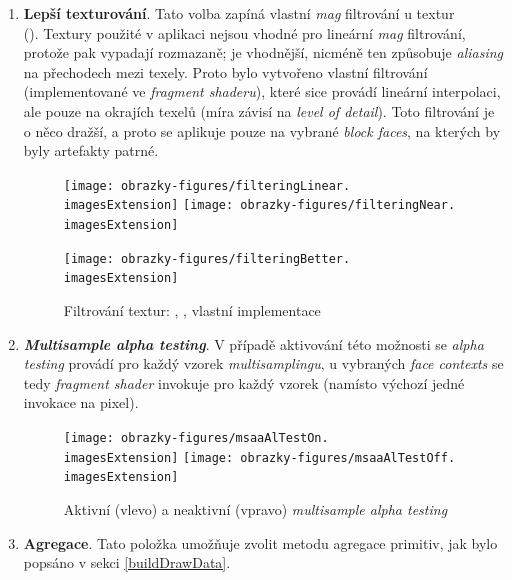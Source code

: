 \begin{enumerate}
	\item \textbf{Lepší texturování}. Tato volba zapíná vlastní \textit{mag} filtrování u textur \\(). Textury použité v aplikaci nejsou vhodné pro lineární \textit{mag} filtrování, protože pak vypadají rozmazaně;  je vhodnější, nicméně ten způsobuje \textit{aliasing} na přechodech mezi texely. Proto bylo vytvořeno vlastní filtrování (implementované ve \textit{fragment shaderu}), které sice provádí lineární interpolaci, ale pouze na okrajích texelů (míra závisí na \textit{level of detail}). Toto filtrování je o něco dražší, a proto se aplikuje pouze na vybrané \textit{block faces}, na kterých by byly artefakty patrné.
	
	\begin{figure}[H]
		\texttt{[image: obrazky-figures/filteringLinear.\\imagesExtension]}
		\hfill
		\texttt{[image: obrazky-figures/filteringNear.\\imagesExtension]}
		
		\vspace{2.2mm}
		
		\texttt{[image: obrazky-figures/filteringBetter.\\imagesExtension]}
		
		\caption{Filtrování textur: , , vlastní implementace}
	\end{figure}
	
	\pagebreak
	\item \textbf{\textit{Multisample alpha testing}}. V případě aktivování této možnosti se \textit{alpha testing} provádí pro každý vzorek \textit{multisamplingu}, u vybraných \textit{face contexts} se tedy \textit{fragment shader} invokuje pro každý vzorek (namísto výchozí jedné invokace na pixel).
	
	\begin{figure}[H]
		\texttt{[image: obrazky-figures/msaaAlTestOn.\\imagesExtension]}
		\hfill
		\texttt{[image: obrazky-figures/msaaAlTestOff.\\imagesExtension]}
		
		\caption{Aktivní (vlevo) a neaktivní (vpravo) \textit{multisample alpha testing}}
	\end{figure}
	
	\item \textbf{Agregace}. Tato položka umožňuje zvolit metodu agregace primitiv, jak bylo popsáno v sekci \ref{buildDrawData}.
	

\end{enumerate}
